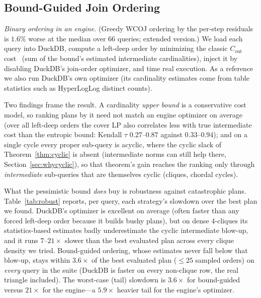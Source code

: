 \documentclass[conference]{IEEEtran}
\begin{document}
\subsection{Bound-Guided Join Ordering}
\label{sec:robustness}\label{sec:wcoj}

\emph{Binary ordering in an engine.} (Greedy WCOJ ordering by the per-step residuals is $1.6\%$ worse at the median over $66$ queries; extended version.) We load each query into DuckDB, compute a
left-deep order by minimizing the classic $C_{\mathrm{out}}$
cost~\cite{cluet1995complexity} (sum of the bound's estimated intermediate
cardinalities), inject it by disabling DuckDB's join-order optimizer, and
time real execution. As a reference we also run DuckDB's own optimizer
(its cardinality estimates come from table statistics such as
HyperLogLog distinct counts).

Two findings frame the result. A cardinality \emph{upper bound} is a
conservative cost model, so ranking plans by it need not match an engine
optimizer on average (over all left-deep orders the cover LP also
correlates less with true intermediate cost than the entropic bound:
Kendall $\tau$ $0.27$--$0.87$ against $0.33$--$0.94$); and on a single
cycle every proper sub-query is acyclic, where the cyclic slack of
Theorem~\ref{thm:cyclic} is absent (intermediate norms can still help there,
Section~\ref{sec:whycyclic}), so that theorem's gain reaches the ranking only
through \emph{intermediate} sub-queries that are themselves cyclic (cliques, chordal cycles).

What the pessimistic bound \emph{does} buy is robustness against
catastrophic plans. Table~\ref{tab:robust} reports, per query, each
strategy's slowdown over the best plan we found. DuckDB's optimizer is
excellent on average (often faster than any forced left-deep order
because it builds bushy plans), but on dense $4$-cliques its
statistics-based estimates badly underestimate the cyclic intermediate
blow-up, and it runs $7$--$21\times$ slower than the best evaluated plan across every clique density we tried. Bound-guided ordering, whose estimates never fall below that blow-up, stays within $3.6\times$ of the best evaluated plan (${\le}25$ sampled orders) on
\emph{every} query in the suite (DuckDB is faster on every non-clique row, the real triangle included). The worst-case (tail) slowdown is
$3.6\times$ for bound-guided versus $21\times$ for the engine---a
$5.9\times$ heavier tail for the engine's optimizer.
\end{document}
